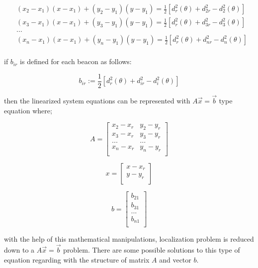 \documentclass[twoside]{article}
\begin{document}
\begin{align*}
  & (x_2 - x_1)(x - x_1) + (y_2 - y_1)(y - y_1) = \frac{1}{2} [d_r^2(\theta) + d_{2r}^2 - d_2^2(\theta)] \\
  & (x_3 - x_1)(x - x_1) + (y_3 - y_1)(y - y_1) = \frac{1}{2} [d_r^2(\theta) + d_{3r}^2 - d_3^2(\theta)] \\
  & ... \\
  & (x_n - x_1)(x - x_1) + (y_n - y_1)(y - y_1) = \frac{1}{2} [d_r^2(\theta) + d_{nr}^2 - d_n^2(\theta)] \\
\end{align*}

if $b_{ir}$ is defined for each beacon as follows:

\begin{equation}
  b_{ir} := \frac{1}{2}[d_r^2(\theta) + d_{ir}^2 - d_i^2(\theta)]
\end{equation}

then the linearized system equations can be represented with $A\vec{x} = \vec{b}$ type equation where;

\begin{equation}
			A = \begin{bmatrix}
			x_2 - x_r & y_2 - y_r\\
			x_3 - x_r & y_3 - y_r\\
			...       & ...      \\
			x_n - x_r & y_n - y_r\\
			\end{bmatrix}				
\end{equation}

\begin{equation}
		x = \begin{bmatrix}
		x - x_r\\
		y - y_r\\
		\end{bmatrix}
\end{equation}

\begin{equation}
b = \begin{bmatrix}
b_{21}\\
b_{31}\\
... \\
b_{n1}\\
\end{bmatrix}
\end{equation}


with the help of this mathematical manipulations, localization problem is reduced down to a $A\vec{x} = \vec{b}$ problem.
There are some possible solutions to this type of equation regarding with the structure of matrix $A$ and vector $b$.\\
\end{document}
